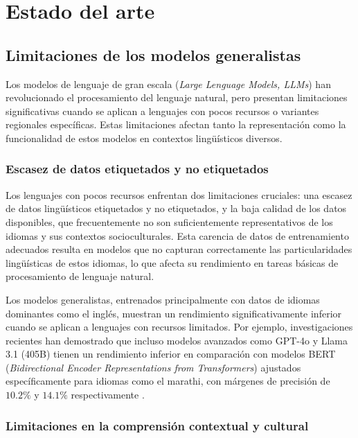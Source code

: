 \documentclass[10pt,twoside]{rcmart} %
\begin{document}

\section{Estado del arte}

\subsection{Limitaciones de los modelos generalistas}

Los modelos de lenguaje de gran escala (\textit{Large Lenguage Models, LLMs}) han revolucionado el procesamiento del lenguaje natural, pero presentan limitaciones significativas cuando se aplican a lenguajes con pocos recursos o variantes regionales específicas. Estas limitaciones afectan tanto la representación como la funcionalidad de estos modelos en contextos lingüísticos diversos.

\subsubsection{Escasez de datos etiquetados y no etiquetados}

Los lenguajes con pocos recursos enfrentan dos limitaciones cruciales: una escasez de datos lingüísticos etiquetados y no etiquetados, y la baja calidad de los datos disponibles, que frecuentemente no son suficientemente representativos de los idiomas y sus contextos socioculturales. Esta carencia de datos de entrenamiento adecuados resulta en modelos que no capturan correctamente las particularidades lingüísticas de estos idiomas, lo que afecta su rendimiento en tareas básicas de procesamiento de lenguaje natural.

Los modelos generalistas, entrenados principalmente con datos de idiomas dominantes como el inglés, muestran un rendimiento significativamente inferior cuando se aplican a lenguajes con recursos limitados. Por ejemplo, investigaciones recientes han demostrado que incluso modelos avanzados como GPT-4o y Llama 3.1 (405B) tienen un rendimiento inferior en comparación con modelos BERT (\textit{Bidirectional Encoder Representations from Transformers}) ajustados específicamente para idiomas como el marathi, con márgenes de precisión de $10.2\%$ y $14.1\%$ respectivamente \cite{jadhav2024limitations}.

\subsubsection{Limitaciones en la comprensión contextual y cultural}
\end{document}
